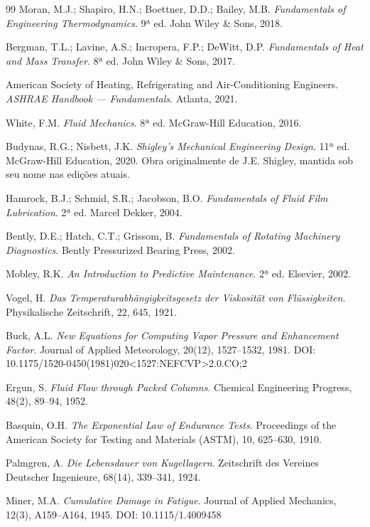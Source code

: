 \documentclass[12pt,a4paper]{article}
\numberwithin{equation}{section}
\numberwithin{table}{section}
\numberwithin{figure}{section}
\begin{document}
\begin{thebibliography}{99}
 Moran, M.J.; Shapiro, H.N.; Boettner, D.D.; Bailey, M.B. \textit{Fundamentals of Engineering Thermodynamics}. 9ª ed. John Wiley \& Sons, 2018.

 Bergman, T.L.; Lavine, A.S.; Incropera, F.P.; DeWitt, D.P. \textit{Fundamentals of Heat and Mass Transfer}. 8ª ed. John Wiley \& Sons, 2017.

 American Society of Heating, Refrigerating and Air-Conditioning Engineers. \textit{ASHRAE Handbook — Fundamentals}. Atlanta, 2021.

 White, F.M. \textit{Fluid Mechanics}. 8ª ed. McGraw-Hill Education, 2016.

 Budynas, R.G.; Nisbett, J.K. \textit{Shigley's Mechanical Engineering Design}. 11ª ed. McGraw-Hill Education, 2020. Obra originalmente de J.E. Shigley, mantida sob seu nome nas edições atuais.

 Hamrock, B.J.; Schmid, S.R.; Jacobson, B.O. \textit{Fundamentals of Fluid Film Lubrication}. 2ª ed. Marcel Dekker, 2004.

 Bently, D.E.; Hatch, C.T.; Grissom, B. \textit{Fundamentals of Rotating Machinery Diagnostics}. Bently Pressurized Bearing Press, 2002.

 Mobley, R.K. \textit{An Introduction to Predictive Maintenance}. 2ª ed. Elsevier, 2002.

 Vogel, H. \textit{Das Temperaturabhängigkeitsgesetz der Viskosität von Flüssigkeiten}. Physikalische Zeitschrift, 22, 645, 1921.

 Buck, A.L. \textit{New Equations for Computing Vapor Pressure and Enhancement Factor}. Journal of Applied Meteorology, 20(12), 1527–1532, 1981. DOI: 10.1175/1520-0450(1981)020\textless 1527:NEFCVP\textgreater 2.0.CO;2

 Ergun, S. \textit{Fluid Flow through Packed Columns}. Chemical Engineering Progress, 48(2), 89–94, 1952.

 Basquin, O.H. \textit{The Exponential Law of Endurance Tests}. Proceedings of the American Society for Testing and Materials (ASTM), 10, 625–630, 1910.

 Palmgren, A. \textit{Die Lebensdauer von Kugellagern}. Zeitschrift des Vereines Deutscher Ingenieure, 68(14), 339–341, 1924.

 Miner, M.A. \textit{Cumulative Damage in Fatigue}. Journal of Applied Mechanics, 12(3), A159–A164, 1945. DOI: 10.1115/1.4009458


\end{thebibliography}
\end{document}

